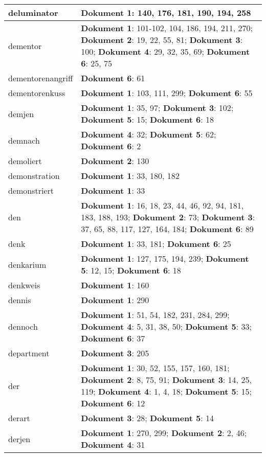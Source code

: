 \documentclass[a5paper]{article}
\begin{document}
\begin{longtable}[l]{|l|p{3in}|}
\hline
deluminator & \textbf{Dokument 1}: 140, 176, 181, 190, 194, 258 \\
\hline
dementor & \textbf{Dokument 1}: 101-102, 104, 186, 194, 211, 270; \textbf{Dokument 2}: 19, 22, 55, 81; \textbf{Dokument 3}: 100; \textbf{Dokument 4}: 29, 32, 35, 69; \textbf{Dokument 6}: 25, 75 \\
\hline
dementorenangriff & \textbf{Dokument 6}: 61 \\
\hline
dementorenkuss & \textbf{Dokument 1}: 103, 111, 299; \textbf{Dokument 6}: 55 \\
\hline
demjen & \textbf{Dokument 1}: 35, 97; \textbf{Dokument 3}: 102; \textbf{Dokument 5}: 15; \textbf{Dokument 6}: 18 \\
\hline
demnach & \textbf{Dokument 4}: 32; \textbf{Dokument 5}: 62; \textbf{Dokument 6}: 2 \\
\hline
demoliert & \textbf{Dokument 2}: 130 \\
\hline
demonstration & \textbf{Dokument 1}: 33, 180, 182 \\
\hline
demonstriert & \textbf{Dokument 1}: 33 \\
\hline
den & \textbf{Dokument 1}: 16, 18, 23, 44, 46, 92, 94, 181, 183, 188, 193; \textbf{Dokument 2}: 73; \textbf{Dokument 3}: 37, 65, 88, 117, 127, 164, 184; \textbf{Dokument 6}: 89 \\
\hline
denk & \textbf{Dokument 1}: 33, 181; \textbf{Dokument 6}: 25 \\
\hline
denkarium & \textbf{Dokument 1}: 127, 175, 194, 239; \textbf{Dokument 5}: 12, 15; \textbf{Dokument 6}: 18 \\
\hline
denkweis & \textbf{Dokument 1}: 160 \\
\hline
dennis & \textbf{Dokument 1}: 290 \\
\hline
dennoch & \textbf{Dokument 1}: 51, 54, 182, 231, 284, 299; \textbf{Dokument 4}: 5, 31, 38, 50; \textbf{Dokument 5}: 33; \textbf{Dokument 6}: 37 \\
\hline
department & \textbf{Dokument 3}: 205 \\
\hline
der & \textbf{Dokument 1}: 30, 52, 155, 157, 160, 181; \textbf{Dokument 2}: 8, 75, 91; \textbf{Dokument 3}: 14, 25, 119; \textbf{Dokument 4}: 1, 4, 18; \textbf{Dokument 5}: 15; \textbf{Dokument 6}: 12 \\
\hline
derart & \textbf{Dokument 3}: 28; \textbf{Dokument 5}: 14 \\
\hline
derjen & \textbf{Dokument 1}: 270, 299; \textbf{Dokument 2}: 2, 46; \textbf{Dokument 4}: 31 \\
\hline

\end{longtable}
\end{document}
